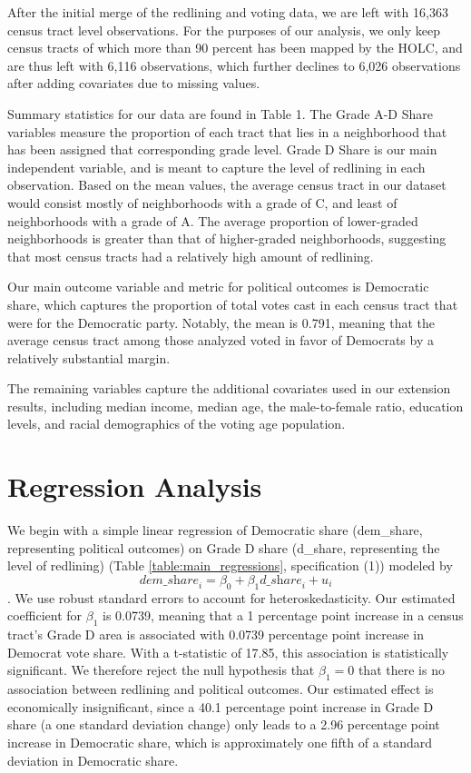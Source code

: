 \documentclass{eco_375_paper}
\begin{document}
After the initial merge of the redlining and voting data, we are left with 16,363 census tract level observations. For the purposes of our analysis, we only keep census tracts of which more than 90 percent has been mapped by the HOLC, and are thus left with 6,116 observations, which further declines to 6,026 observations after adding covariates due to missing values.

Summary statistics for our data are found in Table 1. The Grade A-D Share variables measure the proportion of each tract that lies in a neighborhood that has been assigned that corresponding grade level. Grade D Share is our main independent variable, and is meant to capture the level of redlining in each observation. Based on the mean values, the average census tract in our dataset would consist mostly of neighborhoods with a grade of C, and least of neighborhoods with a grade of A. The average proportion of lower-graded neighborhoods is greater than that of higher-graded neighborhoods, suggesting that most census tracts had a relatively high amount of redlining.

Our main outcome variable and metric for political outcomes is Democratic share, which captures the proportion of total votes cast in each census tract that were for the Democratic party. Notably, the mean is 0.791, meaning that the average census tract among those analyzed voted in favor of Democrats by a relatively substantial margin.

The remaining variables capture the additional covariates used in our extension results, including median income, median age, the male-to-female ratio, education levels, and racial demographics of the voting age population. 
	
\section*{Regression Analysis}
We begin with a simple linear regression of Democratic share (dem\_share, representing political outcomes) on Grade D share (d\_share, representing the level of redlining) (Table \ref{table:main_regressions}, specification (1)) modeled by $${\textit{dem\_share}_i} = {\beta_0} + {\beta_1}{\textit{d\_share}_i} + u_i$$. We use robust standard errors to account for heteroskedasticity. Our estimated coefficient for $\beta_1$ is 0.0739, meaning that a 1 percentage point increase in a census tract’s Grade D area is associated with 0.0739 percentage point increase in Democrat vote share. With a t-statistic of 17.85, this association is statistically significant. We therefore reject the null hypothesis that $\beta_1 = 0$ that there is no association between redlining and political outcomes. Our estimated effect is economically insignificant, since a 40.1 percentage point increase in Grade D share (a one standard deviation change) only leads to a 2.96 percentage point increase in Democratic share, which is approximately one fifth of a standard deviation in Democratic share.
\end{document}
